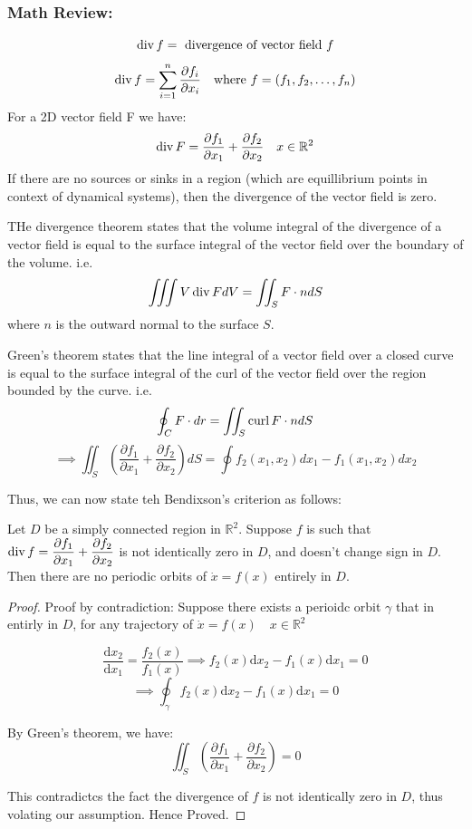 \subsubsection*{Math Review:}
\[
    \operatorname{div} f = \text{ divergence of vector field } f
\]
\[
    \operatorname{div} f = \sum_{i=1}^{n} \frac{\partial f_i}{\partial x_i} \quad \text{where } f = (f_1, f_2, \dots, f_n)
\]
For a 2D vector field F we have:
\[
    \operatorname{div} F = \frac{\partial f_1}{\partial x_1} + \frac{\partial f_2}{\partial x_2} \quad x \in \mathbb{R}^2
\]
If there are no sources or sinks in a region (which are equillibrium points in context 
of dynamical systems), then the divergence of the vector field is zero.

\begin{theorem}
    THe divergence theorem states that the volume integral of the divergence of a vector field
    is equal to the surface integral of the vector field over the boundary of the volume. i.e.
    \[
        \iiint{V} \operatorname{div} F dV = \iint_{S} F \cdot n dS
    \]
    where \(n\) is the outward normal to the surface \(S\).

   Green's theorem states that the line integral of a vector field over a closed curve is equal
    to the surface integral of the curl of the vector field over the region bounded by the curve.
    i.e.
    \[
        \oint_{C} F \cdot dr = \iint_{S} \operatorname{curl} F \cdot n dS
    \]
    \[
        \implies \iint_S \left( 
            \frac{\partial f_1}{\partial x_1} + \frac{\partial f_2}{\partial x_2}
         \right) dS = \oint f_2(x_1, x_2) dx_1 - f_1(x_1, x_2) dx_2
    \]
\end{theorem}

Thus, we can now state teh Bendixson's criterion as follows:
\begin{theorem}
    Let \(D\) be a simply connected region in \(\mathbb{R}^2\). Suppose 
    \(f\) is such that \(\operatorname{div} f = \dfrac{\partial f_1}{\partial x_1} + \dfrac{\partial f_2}
    {\partial x_2}\) is not identically zero in \(D\), and doesn't change sign in \(D\).
    Then there are no periodic orbits of \(\dot{x} = f(x)\) entirely in \(D\).
\end{theorem}
\begin{proof}
    Proof by contradiction: Suppose there exists a perioidc orbit \(\gamma \) that in 
    entirly in \(D\), for any trajectory of \(\dot{x} = f(x) \quad x \in \mathbb{R} ^{2} \)
    
    \[
        \frac{\mathrm{d}x_2}{\mathrm{d}x_1} = \frac{f_2 (x)}{f_1 (x)} \implies 
         f_2 (x) \mathrm{d}x_2 - f_1 (x) \mathrm{d}x_1 = 0
    \]
    \[
        \implies \oint_{\gamma} f_2 (x) \mathrm{d}x_2 - f_1 (x) \mathrm{d}x_1 = 0
    \]

    By Green's theorem, we have:
    \[
        \iint_S \left( 
            \frac{\partial f_1}{\partial x_1} + \frac{\partial f_2}{\partial x_2}
         \right) = 0
    \]

    This contradictcs the fact the divergence of \(f\) is not identically zero in \(D\), thus
    volating our assumption. Hence Proved.
\end{proof}


